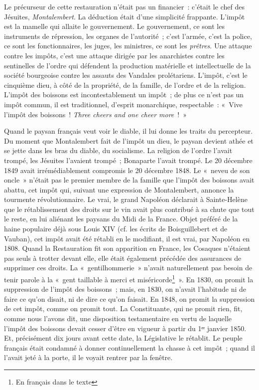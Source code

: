 \documentclass[french,twoside]{book} %
\begin{document}
Le précurseur de cette restauration n’était pas un financier : c’était le chef des Jésuites, \emph{Montalembert}. La déduction était d’une simplicité frappante. L’impôt est la mamelle qui allaite le gouvernement. Le gouvernement, ce sont les instruments de répression, les organes de l’autorité ; c’est l’armée, c’est la police, ce sont les fonctionnaires, les juges, les ministres, ce sont les \emph{prêtres}. Une attaque contre les impôts, c’est une attaque dirigée par les anarchistes contre les sentinelles de l’ordre qui défendent la production matérielle et intellectuelle de la société bourgeoise contre les assauts des Vandales prolétariens. L’impôt, c’est le cinquième dieu, à côté de la propriété, de la famille, de l’ordre et de la religion. L’impôt des boissons est incontestablement un impôt ; de plus ce n’est pas un impôt commun, il est traditionnel, d’esprit monarchique, respectable : « Vive l’impôt des boissons ! \emph{Three cheers and one cheer more} ! »\par
Quand le paysan français veut voir le diable, il lui donne les traits du percepteur. Du moment que Montalembert fait de l’impôt un dieu, le paysan devient athée et se jette dans les bras du diable, du socialisme. La religion de l’ordre l’avait trompé, les Jésuites l’avaient trompé ; Bonaparte l’avait trompé. Le 20 décembre 1849 avait irrémédiablement compromis le 20 décembre 1848. Le « neveu de son oncle » n’était pas le premier membre de la famille que l’impôt des boissons avait abattu, cet impôt qui, suivant une expression de Montalembert, annonce la tourmente révolutionnaire. Le vrai, le grand Napoléon déclarait à Sainte-Helène que le rétablissement des droits sur le vin avait plus contribué à sa chute que tout le reste, en lui aliénant les paysans du Midi de la France. Objet préféré de la haine populaire déjà sous Louis XIV (cf. les écrits de Boisguillebert et de Vauban), cet impôt avait été rétabli en le modifiant, il est vrai, par Napoléon en 1808. Quand la Restauration fit son apparition en France, les Cosaques n’étaient pas seuls à trotter devant elle, elle était également précédée des assurances de supprimer ces droits. La « gentilhommerie » n’avait naturellement pas besoin de tenir parole à la « gent taillable à merci et miséricorde\footnote{En français dans le texte} ». En 1830, on promit la suppression de l’impôt des boissons ; mais, en 1830, on n’avait l’habitude ni de faire ce qu’on disait, ni de dire ce qu’on faisait. En 1848, on promit la suppression de cet impôt, comme on promit tout. La Constituante, qui ne promit rien, fit, comme nous l’avons dit, une disposition testamentaire en vertu de laquelle l’impôt des boissons devait cesser d’être en vigueur à partir du 1ᵉʳ janvier 1850. Et, précisément dix jours avant cette date, la Législative le rétablit. Le peuple français était condamné à donner continuellement la chasse à cet impôt ; quand il l’avait jeté à la porte, il le voyait rentrer par la fenêtre.\par
\end{document}
